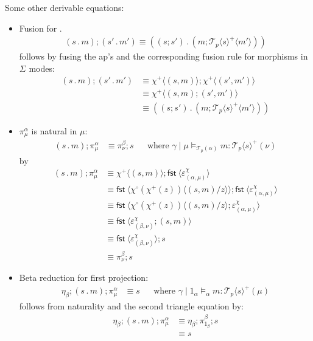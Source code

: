 \documentclass[10pt]{article}
\theoremstyle{definition}
\newcommand\dsd[1]{\ensuremath{\mathsf{#1}}}
\newcommand\TermTwoT[5]{\ensuremath{#1 \mid #3 \vDash_{#5} #2 : #4}}
\newcommand\El[2]{\mathcal{T}_{#1}(#2)}
\newcommand\ApEl[2]{\mathcal{T}_{#1}\langle#2\rangle}
\newcommand\ap[2]{\ensuremath{#1 \langle #2 \rangle }}
\newcommand{\app}[2]{\ensuremath{#1 \: #2}}
\newcommand{\fst}[1]{\app{\dsd{fst}}{#1}}
\newcommand\bdot[0]{\mathbin{.}}
\begin{document}
Some other derivable equations:
\begin{itemize}
\item Fusion for $.$
\begin{align}
\label{dot-fusion}
    (s \bdot m);(s' \bdot m') \equiv ((s;s') \bdot (m;\ap {\ApEl{p}{s}^+} {m'}))
\end{align}
follows by fusing the ap's and the corresponding fusion rule for morphisms in $\Sigma$ modes:
\begin{align*}
(s \bdot m);(s' \bdot m') &\equiv \ap{\chi^+}{(s, m)} ; \ap{\chi^+}{(s', m')} \\
&\equiv \ap{\chi^+}{(s, m);(s', m')} \\
&\equiv ((s;s') \bdot (m;\ap {\ApEl{p}{s}^+} {m'}))
\end{align*}

\item $\pi^\alpha_\mu$ is natural in $\mu$:
  \begin{align}
  \label{pi-naturality}
  (s \bdot m); \pi^\alpha_\mu &\equiv \pi^\beta_\nu;s && \text{where } \TermTwoT{\gamma}{m}{\mu}{\ApEl{p}{s}^+(\nu)}{\El{p}{\alpha}}
  \end{align}
  by
  \begin{align*}
  (s \bdot m); \pi^\alpha_\mu 
  &\equiv \ap{\chi^+}{(s, m)} ; \ap \fst {\varepsilon^\chi_{(\alpha, \mu)}} \\  
  &\equiv \ap{\fst}{\ap{\chi^\circ(\chi^+(z))}{(s, m)/z}} ; \ap \fst {\varepsilon^\chi_{(\alpha, \mu)}} \\
  &\equiv \ap{\fst}{\ap{\chi^\circ(\chi^+(z))}{(s, m)/z} ; \varepsilon^\chi_{(\alpha, \mu)}} \\
  &\equiv \ap{\fst}{\varepsilon^\chi_{(\beta, \nu)}; (s, m) } \\
  &\equiv \ap{\fst}{\varepsilon^\chi_{(\beta, \nu)}} ; s\\
  &\equiv \pi^\beta_\nu ; s
  \end{align*}
\item Beta reduction for first projection:
  \begin{align}
\label{beta-pi}
\eta_\beta;(s \bdot m);\pi^\alpha_\mu &\equiv s && \text{where } \TermTwoT{\gamma}{m}{1_\alpha}{\ApEl{p}{s}^+(\mu)}{\alpha}
  \end{align}
follows from naturality and the second triangle equation by:
\begin{align*}
\eta_\beta;(s \bdot m);\pi^\alpha_\mu
&\equiv \eta_\beta;\pi^\beta_{1_\beta};s \\
&\equiv s
\end{align*}


\end{itemize}
\end{document}

